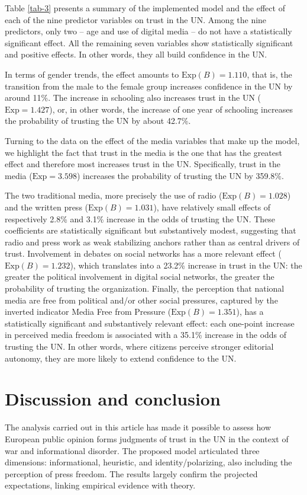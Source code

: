 \documentclass[english]{textolivre}
\begin{document}
Table \ref{tab-3} presents a summary of the implemented model and the effect of each of the nine predictor variables on trust in the UN. Among the nine predictors, only two -- age and use of digital media -- do not have a statistically significant effect. All the remaining seven variables show statistically significant and positive effects. In other words, they all build confidence in the UN.

In terms of gender trends, the effect amounts to $\text{Exp}(B)=1.110$, that is, the transition from the male to the female group increases confidence in the UN by around 11\%. The increase in schooling also increases trust in the UN ($\text{Exp}=1.427$), or, in other words, the increase of one year of schooling increases the probability of trusting the UN by about 42.7\%.

Turning to the data on the effect of the media variables that make up the model, we highlight the fact that trust in the media is the one that has the greatest effect and therefore most increases trust in the UN. Specifically, trust in the media ($\text{Exp}=3.598$) increases the probability of trusting the UN by 359.8\%.

The two traditional media, more precisely the use of radio ($\text{Exp}(B)=1.028$) and the written press ($\text{Exp}(B)=1.031$), have relatively small effects of respectively 2.8\% and 3.1\% increase in the odds of trusting the UN. These coefficients are statistically significant but substantively modest, suggesting that radio and press work as weak stabilizing anchors rather than as central drivers of trust. Involvement in debates on social networks has a more relevant effect ($\text{Exp}(B)=1.232$), which translates into a 23.2\% increase in trust in the UN: the greater the political involvement in digital social networks, the greater the probability of trusting the organization. Finally, the perception that national media are free from political and/or other social pressures, captured by the inverted indicator Media Free from Pressure ($\text{Exp}(B)=1.351$), has a statistically significant and substantively relevant effect: each one-point increase in perceived media freedom is associated with a 35.1\% increase in the odds of trusting the UN. In other words, where citizens perceive stronger editorial autonomy, they are more likely to extend confidence to the UN.

\section{Discussion and conclusion}
The analysis carried out in this article has made it possible to assess how European public opinion forms judgments of trust in the UN in the context of war and informational disorder. The proposed model articulated three dimensions: informational, heuristic, and identity/polarizing, also including the perception of press freedom. The results largely confirm the projected expectations, linking empirical evidence with theory.
\end{document}
